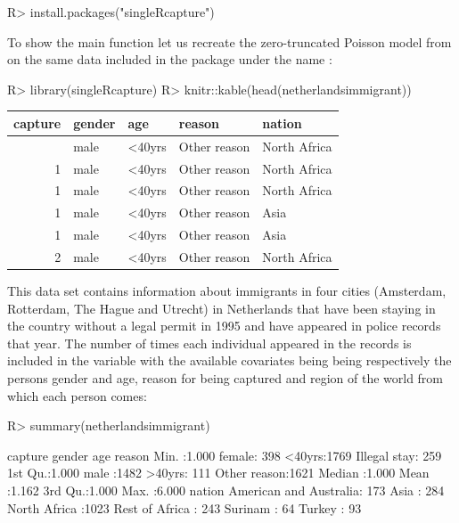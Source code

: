 \documentclass[
]{jss}
\newcommand{\1}{\mathcal{I}} \newcommand{\bZero}{\boldsymbol{0}}
\begin{document}
\begin{CodeChunk}
\begin{CodeInput}
R> install.packages("singleRcapture")
\end{CodeInput}
\end{CodeChunk}

To show the main function let us recreate the zero-truncated Poisson
model from \cite{ztpoisson} on the same data included in the package
under the name :

\begin{CodeInput}
R> library(singleRcapture)
R> knitr::kable(head(netherlandsimmigrant))
\end{CodeInput}

\begin{longtable}[]{@{}rllll@{}}
\toprule\noalign{}
capture & gender & age & reason & nation \\
\midrule\noalign{}
\endhead
\bottomrule\noalign{}
\endlastfoot
1 & male & \textless40yrs & Other reason & North Africa \\
1 & male & \textless40yrs & Other reason & North Africa \\
1 & male & \textless40yrs & Other reason & North Africa \\
1 & male & \textless40yrs & Other reason & Asia \\
1 & male & \textless40yrs & Other reason & Asia \\
2 & male & \textless40yrs & Other reason & North Africa \\
\end{longtable}

This data set contains information about immigrants in four cities
(Amsterdam, Rotterdam, The Hague and Utrecht) in Netherlands that have
been staying in the country without a legal permit in 1995 and have
appeared in police records that year. The number of times each
individual appeared in the records is included in the 
variable with the available covariates being
 being respectively the persons gender
and age, reason for being captured and region of the world from which
each person comes:

\begin{CodeChunk}
\begin{CodeInput}
R> summary(netherlandsimmigrant)
\end{CodeInput}
\begin{CodeOutput}
    capture         gender         age                reason    
 Min.   :1.000   female: 398   <40yrs:1769   Illegal stay: 259  
 1st Qu.:1.000   male  :1482   >40yrs: 111   Other reason:1621  
 Median :1.000                                                  
 Mean   :1.162                                                  
 3rd Qu.:1.000                                                  
 Max.   :6.000                                                  
                    nation    
 American and Australia: 173  
 Asia                  : 284  
 North Africa          :1023  
 Rest of Africa        : 243  
 Surinam               :  64  
 Turkey                :  93  
\end{CodeOutput}
\end{CodeChunk}
\end{document}
